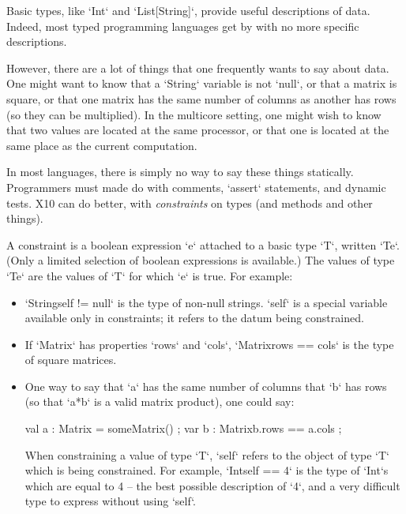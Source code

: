 

Basic types, like \xcd`Int` and \xcd`List[String]`, provide useful
descriptions of data.  Indeed, most typed programming languages get by with no
more specific descriptions.

However, there are a lot of things that one frequently wants to say about
data.  One might want to know that a \xcd`String` variable is not \xcd`null`,
or that a matrix is square, or that one matrix has the same number of columns
as another has rows (so they can be multiplied).  In the multicore setting,
one might wish to know that two values are located at the same processor, or
that one is located at the same place as the current computation.

In most languages, there is simply no way to say these things statically.
Programmers must made do with comments, \xcd`assert` statements, and dynamic
tests.  X10 can do better, with {\em constraints} on types (and methods and
other things).

A constraint is a boolean expression \xcd`e` attached to a basic type \xcd`T`,
written \xcd`T{e}`.  (Only a limited selection of boolean expressions is
available.)  The values of type \xcd`T{e}` are the values of \xcd`T` for which
\xcd`e` is true.  For example: 

\begin{itemize}
\item \xcd`String{self != null}` is the type of non-null strings.  \xcd`self`
      is a special variable available only in constraints; it refers to the
      datum being constrained.   
\item If \xcd`Matrix` has properties \xcd`rows` and \xcd`cols`, 
      \xcd`Matrix{rows == cols}` is the type of square matrices.
\item One way to say that \xcd`a` has the same number of columns that \xcd`b`
      has rows (so that \xcd`a*b` is a valid matrix product), one could say: 
\begin{xten}
  val a : Matrix = someMatrix() ;
  var b : Matrix{b.rows == a.cols} ;
\end{xten}



When constraining a value of type \xcd`T`, \xcd`self` refers to the object of
type \xcd`T` which is being constrained.  For example, \xcd`Int{self == 4}` is
the type of \xcd`Int`s which are equal to 4 -- the best possible description
of \xcd`4`, and a very difficult type to express without using \xcd`self`.  
\end{itemize}





